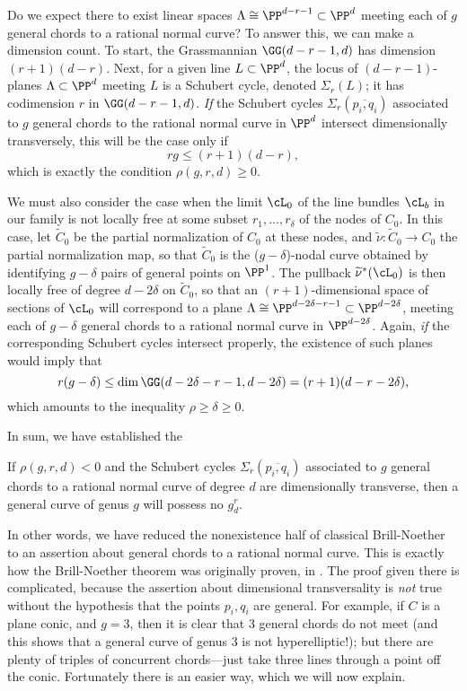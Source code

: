 Do we expect there to exist linear spaces $\Lambda \cong \PP^{d-r-1} \subset \PP^d$ meeting each of $g$ general chords to a rational normal curve? To answer this, we can make a dimension count. To start, the Grassmannian $\GG(d-r-1,d)$ has dimension $(r+1)(d-r)$. Next, for a given line $L \subset \PP^d$, the locus of $(d-r-1)$-planes $\Lambda \subset \PP^d$ meeting $L$ is a Schubert cycle, denoted $\Sigma_r(L)$; it has codimension $r$ in $\GG(d-r-1,d)$. \emph{If}  the Schubert cycles $\Sigma_r(\overline{p_i,q_i})$ associated to $g$ general chords to the rational normal curve in $\PP^d$ intersect dimensionally transversely, this will be the case only if
$$
rg \leq (r+1)(d-r),
$$
which is exactly the condition $\rho(g,r,d) \geq 0$.

We must also consider the case when the limit $\cL_0$ of the line bundles $\cL_b$ in our family is not locally free at some subset $r_1, \dots, r_\delta$ of the nodes of $C_0$. In this case, let $\widetilde C_0$ be the partial normalization of $C_0$ at these nodes, and $\widetilde \nu : \widetilde C_0 \to C_0$ the partial normalization map, so that $\widetilde C_0$ is the ($g-\delta$)-nodal curve obtained by identifying $g-\delta$ pairs of general points on $\PP^1$. The pullback $\widetilde \nu^*(\cL_0)$ is then locally free of degree $d-2\delta$ on $\widetilde C_0$, so that an $(r+1)$-dimensional space of sections of $\cL_0$ will correspond to a plane $\Lambda \cong \PP^{d-2\delta-r-1} \subset \PP^{d-2\delta}$, meeting each of $g-\delta$ general chords to a rational normal curve in $\PP^{d-2\delta}$. Again, \emph{if} the corresponding Schubert cycles intersect properly, the existence of such planes would imply that
$$
r(g-\delta) \leq \dim\GG(d-2\delta-r-1,d-2\delta) = (r+1)(d-r-2\delta),
$$
which amounts to the inequality $\rho \geq \delta \geq 0$. 

In sum, we have established the 

\begin{theorem} If $\rho(g,r,d)<0$ and 
the Schubert cycles $\Sigma_r(\overline{p_i,q_i})$ associated to $g$ general chords to a rational normal curve of degree $d$ are dimensionally transverse, then a general curve of genus $g$ will possess no $g^r_d$.
\end{theorem}

In other words, we have reduced the nonexistence half of classical Brill-Noether to an assertion about general chords to a rational normal curve. This is exactly how
the Brill-Noether theorem was originally proven, in \cite{}. The proof given there is
complicated, because the assertion about dimensional transversality
is \emph{not} true without the hypothesis that the points $p_i,q_i$ are general. For example, if $C$ is a plane conic, and $g=3$, then it is clear that 3 general chords do not meet (and this shows that a general curve of genus 3 is not hyperelliptic!); but there are plenty of triples of concurrent chords---just take three lines through a point off the conic. Fortunately there is an easier way, which we will now explain.

